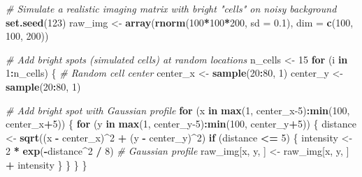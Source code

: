 \documentclass[
]{article}
\newenvironment{Shaded}{\begin{snugshade}}{\end{snugshade}}
\newcommand{\AttributeTok}[1]{\textcolor[rgb]{0.13,0.29,0.53}{#1}}
\newcommand{\CommentTok}[1]{\textcolor[rgb]{0.56,0.35,0.01}{\textit{#1}}}
\newcommand{\ControlFlowTok}[1]{\textcolor[rgb]{0.13,0.29,0.53}{\textbf{#1}}}
\newcommand{\DecValTok}[1]{\textcolor[rgb]{0.00,0.00,0.81}{#1}}
\newcommand{\FloatTok}[1]{\textcolor[rgb]{0.00,0.00,0.81}{#1}}
\newcommand{\FunctionTok}[1]{\textcolor[rgb]{0.13,0.29,0.53}{\textbf{#1}}}
\newcommand{\NormalTok}[1]{#1}
\newcommand{\OtherTok}[1]{\textcolor[rgb]{0.56,0.35,0.01}{#1}}
\newcommand{\SpecialCharTok}[1]{\textcolor[rgb]{0.81,0.36,0.00}{\textbf{#1}}}
\begin{document}
\begin{Shaded}
\begin{Highlighting}[]
\CommentTok{\# Simulate a realistic imaging matrix with bright "cells" on noisy background}
\FunctionTok{set.seed}\NormalTok{(}\DecValTok{123}\NormalTok{)}
\NormalTok{raw\_img }\OtherTok{\textless{}{-}} \FunctionTok{array}\NormalTok{(}\FunctionTok{rnorm}\NormalTok{(}\DecValTok{100}\SpecialCharTok{*}\DecValTok{100}\SpecialCharTok{*}\DecValTok{200}\NormalTok{, }\AttributeTok{sd =} \FloatTok{0.1}\NormalTok{), }\AttributeTok{dim =} \FunctionTok{c}\NormalTok{(}\DecValTok{100}\NormalTok{, }\DecValTok{100}\NormalTok{, }\DecValTok{200}\NormalTok{))}

\CommentTok{\# Add bright spots (simulated cells) at random locations}
\NormalTok{n\_cells }\OtherTok{\textless{}{-}} \DecValTok{15}
\ControlFlowTok{for}\NormalTok{ (i }\ControlFlowTok{in} \DecValTok{1}\SpecialCharTok{:}\NormalTok{n\_cells) \{}
  \CommentTok{\# Random cell center}
\NormalTok{  center\_x }\OtherTok{\textless{}{-}} \FunctionTok{sample}\NormalTok{(}\DecValTok{20}\SpecialCharTok{:}\DecValTok{80}\NormalTok{, }\DecValTok{1}\NormalTok{)}
\NormalTok{  center\_y }\OtherTok{\textless{}{-}} \FunctionTok{sample}\NormalTok{(}\DecValTok{20}\SpecialCharTok{:}\DecValTok{80}\NormalTok{, }\DecValTok{1}\NormalTok{)}
  
  \CommentTok{\# Add bright spot with Gaussian profile}
  \ControlFlowTok{for}\NormalTok{ (x }\ControlFlowTok{in} \FunctionTok{max}\NormalTok{(}\DecValTok{1}\NormalTok{, center\_x}\DecValTok{{-}5}\NormalTok{)}\SpecialCharTok{:}\FunctionTok{min}\NormalTok{(}\DecValTok{100}\NormalTok{, center\_x}\SpecialCharTok{+}\DecValTok{5}\NormalTok{)) \{}
    \ControlFlowTok{for}\NormalTok{ (y }\ControlFlowTok{in} \FunctionTok{max}\NormalTok{(}\DecValTok{1}\NormalTok{, center\_y}\DecValTok{{-}5}\NormalTok{)}\SpecialCharTok{:}\FunctionTok{min}\NormalTok{(}\DecValTok{100}\NormalTok{, center\_y}\SpecialCharTok{+}\DecValTok{5}\NormalTok{)) \{}
\NormalTok{      distance }\OtherTok{\textless{}{-}} \FunctionTok{sqrt}\NormalTok{((x }\SpecialCharTok{{-}}\NormalTok{ center\_x)}\SpecialCharTok{\^{}}\DecValTok{2} \SpecialCharTok{+}\NormalTok{ (y }\SpecialCharTok{{-}}\NormalTok{ center\_y)}\SpecialCharTok{\^{}}\DecValTok{2}\NormalTok{)}
      \ControlFlowTok{if}\NormalTok{ (distance }\SpecialCharTok{\textless{}=} \DecValTok{5}\NormalTok{) \{}
\NormalTok{        intensity }\OtherTok{\textless{}{-}} \DecValTok{2} \SpecialCharTok{*} \FunctionTok{exp}\NormalTok{(}\SpecialCharTok{{-}}\NormalTok{distance}\SpecialCharTok{\^{}}\DecValTok{2} \SpecialCharTok{/} \DecValTok{8}\NormalTok{)  }\CommentTok{\# Gaussian profile}
\NormalTok{        raw\_img[x, y, ] }\OtherTok{\textless{}{-}}\NormalTok{ raw\_img[x, y, ] }\SpecialCharTok{+}\NormalTok{ intensity}
\NormalTok{      \}}
\NormalTok{    \}}
\NormalTok{  \}}
\NormalTok{\}}


\end{Highlighting}
\end{Shaded}
\end{document}
